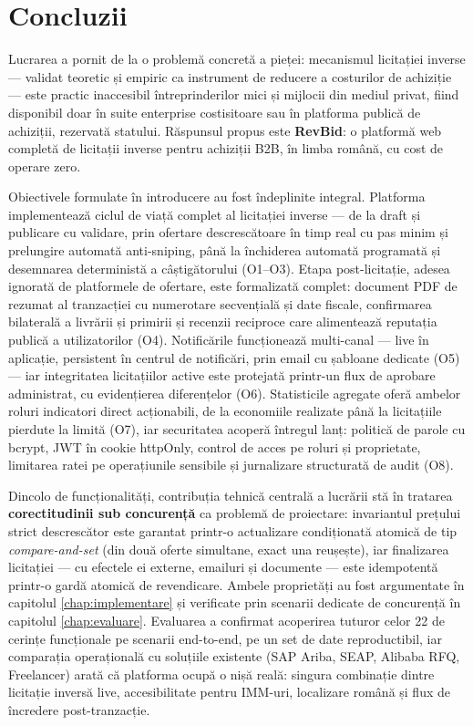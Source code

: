 \chapter{Concluzii}
\label{chap:concluzii}

Lucrarea a pornit de la o problemă concretă a pieței: mecanismul licitației inverse --- validat teoretic \cite{vickrey1961, mcafee1987} și empiric \cite{jap2002, smeltzer2003} ca instrument de reducere a costurilor de achiziție --- este practic inaccesibil întreprinderilor mici și mijlocii din mediul privat, fiind disponibil doar în suite enterprise costisitoare sau în platforma publică de achiziții, rezervată statului. Răspunsul propus este \textbf{RevBid}: o platformă web completă de licitații inverse pentru achiziții B2B, în limba română, cu cost de operare zero.

Obiectivele formulate în introducere au fost îndeplinite integral. Platforma implementează ciclul de viață complet al licitației inverse --- de la draft și publicare cu validare, prin ofertare descrescătoare în timp real cu pas minim și prelungire automată anti-sniping, până la închiderea automată programată și desemnarea deterministă a câștigătorului (O1--O3). Etapa post-licitație, adesea ignorată de platformele de ofertare, este formalizată complet: document PDF de rezumat al tranzacției cu numerotare secvențială și date fiscale, confirmarea bilaterală a livrării și primirii și recenzii reciproce care alimentează reputația publică a utilizatorilor (O4). Notificările funcționează multi-canal --- live în aplicație, persistent în centrul de notificări, prin email cu șabloane dedicate (O5) --- iar integritatea licitațiilor active este protejată printr-un flux de aprobare administrat, cu evidențierea diferențelor (O6). Statisticile agregate oferă ambelor roluri indicatori direct acționabili, de la economiile realizate până la licitațiile pierdute la limită (O7), iar securitatea acoperă întregul lanț: politică de parole cu bcrypt, JWT în cookie httpOnly, control de acces pe roluri și proprietate, limitarea ratei pe operațiunile sensibile și jurnalizare structurată de audit (O8).

Dincolo de funcționalități, contribuția tehnică centrală a lucrării stă în tratarea \textbf{corectitudinii sub concurență} ca problemă de proiectare: invariantul prețului strict descrescător este garantat printr-o actualizare condiționată atomică de tip \textit{compare-and-set} (din două oferte simultane, exact una reușește), iar finalizarea licitației --- cu efectele ei externe, emailuri și documente --- este idempotentă printr-o gardă atomică de revendicare. Ambele proprietăți au fost argumentate în capitolul \ref{chap:implementare} și verificate prin scenarii dedicate de concurență în capitolul \ref{chap:evaluare}. Evaluarea a confirmat acoperirea tuturor celor 22 de cerințe funcționale pe scenarii end-to-end, pe un set de date reproductibil, iar comparația operațională cu soluțiile existente (SAP Ariba, SEAP, Alibaba RFQ, Freelancer) arată că platforma ocupă o nișă reală: singura combinație dintre licitație inversă live, accesibilitate pentru IMM-uri, localizare română și flux de încredere post-tranzacție.

